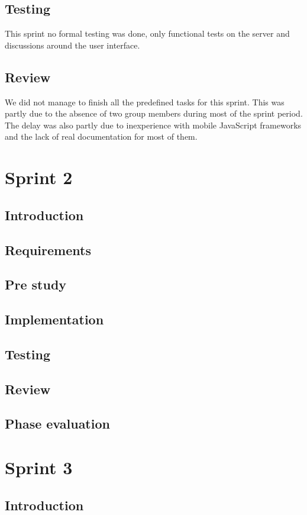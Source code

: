 \documentclass[11pt]{book}
\begin{document}
\subsection{Testing}
This sprint no formal testing was done, only functional tests on the server and discussions around the user interface.

\subsection{Review}
We did not manage to finish all the predefined tasks for this sprint. This was partly due to the absence of two group members during most of the sprint period. The delay was also partly due to inexperience with mobile JavaScript frameworks and the lack of real documentation for most of them.

\section{Sprint 2}
\subsection{Introduction}
\subsection{Requirements}
\subsection{Pre study}
\subsection{Implementation}
\subsection{Testing}
\subsection{Review}
\subsection{Phase evaluation}

\section{Sprint 3}
\subsection{Introduction}
\end{document}
